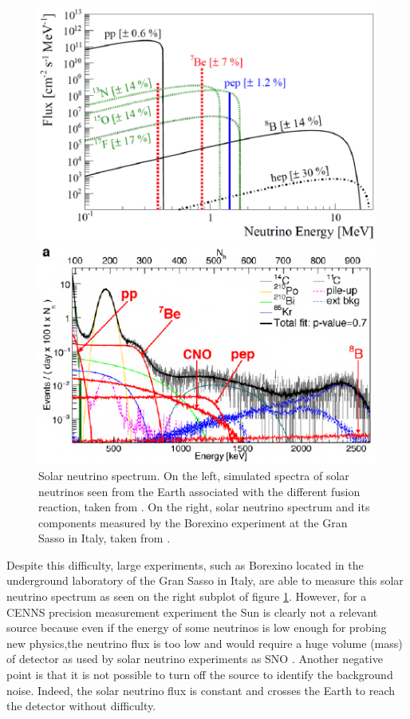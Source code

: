 \begin{figure}
\begin{minipage}{0.48\textwidth}
\includegraphics [scale=1]{Figures/Introduction/solar_neutrino_spectrum_simu.pdf}
\end{minipage}
\hfill
\begin{minipage}{0.48\textwidth}
\includegraphics [scale=1]{Figures/Introduction/solar_neutrino_spectrum_exp.pdf}
\end{minipage}
\caption{Solar neutrino spectrum. On the left, simulated spectra of solar neutrinos seen from the Earth associated with the different fusion reaction, taken from \cite{DAngelo:2014lmb}.
On the right, solar neutrino spectrum and its components measured by the Borexino experiment at the Gran Sasso in Italy, taken from \cite{Redchuk:2020mza}.}
\label{fig:solar-neutrino-spectrum}
\end{figure}

Despite this difficulty, large experiments, such as Borexino located in the underground laboratory of the Gran Sasso in Italy, are able to measure this solar neutrino spectrum as seen on the right subplot of figure \ref{fig:solar-neutrino-spectrum}. However, for a CENNS precision measurement experiment the Sun is clearly not a relevant source because even if the energy of some neutrinos is low enough for probing new physics,the neutrino flux is too low and would require a huge volume (mass) of detector as used by solar neutrino experiments as SNO \cite{Bellerive:2016}. Another negative point is that it is not possible to turn off the source to identify the background noise. Indeed, the solar neutrino flux is constant and crosses the Earth to reach the detector without difficulty.

